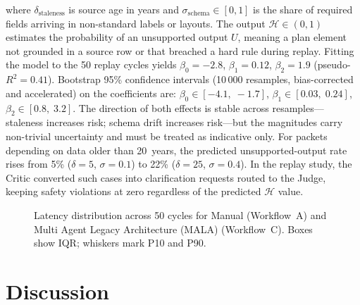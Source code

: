 \documentclass[conference]{IEEEtran}
\newcommand{\MALA}{Multi Agent Legacy Architecture (MALA)}
\begin{document}
where $\delta_{\text{staleness}}$ is source age in years and $\sigma_{\text{schema}} \in [0,1]$ is the share of required fields arriving in non-standard labels or layouts. The output $\mathcal{H} \in (0,1)$ estimates the probability of an unsupported output $U$, meaning a plan element not grounded in a source row or that breached a hard rule during replay. Fitting the model to the 50 replay cycles yields $\beta_0 = -2.8$, $\beta_1 = 0.12$, $\beta_2 = 1.9$ (pseudo-$R^2 = 0.41$). Bootstrap 95\% confidence intervals (10\,000 resamples, bias-corrected and accelerated) on the coefficients are: $\beta_0 \in [-4.1,\;-1.7]$, $\beta_1 \in [0.03,\;0.24]$, $\beta_2 \in [0.8,\;3.2]$. The direction of both effects is stable across resamples---staleness increases risk; schema drift increases risk---but the magnitudes carry non-trivial uncertainty and must be treated as indicative only. For packets depending on data older than 20~years, the predicted unsupported-output rate rises from 5\% ($\delta = 5$, $\sigma = 0.1$) to 22\% ($\delta = 25$, $\sigma = 0.4$). In the replay study, the Critic converted such cases into clarification requests routed to the Judge, keeping safety violations at zero regardless of the predicted $\mathcal{H}$ value.

\begin{figure}[!t]
\centering
\sffamily
{}
\caption{Latency distribution across 50 cycles for Manual (Workflow~A) and \MALA{} (Workflow~C). Boxes show IQR; whiskers mark P10 and P90.}\label{fig:latency_box}
\end{figure}


\section{Discussion}
\end{document}
